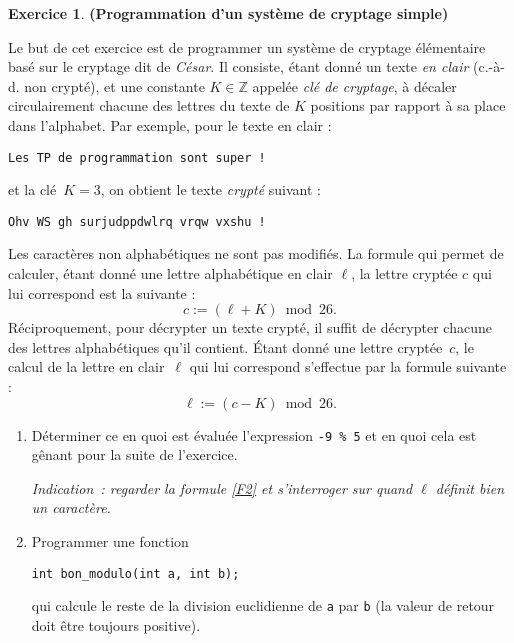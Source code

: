 \documentclass[12pt]{article}
\theoremstyle{definition}
\newtheorem{Exercice}{Exercice}
\begin{document}
\begin{Exercice} {\bf (Programmation d'un système de cryptage simple)}
\smallskip

Le but de cet exercice est de programmer un système de cryptage élémentaire
basé sur le cryptage dit de \textit{César}. Il consiste, étant donné un
texte \textit{en clair} (c.-à-d. non crypté), et une constante
$K \in \mathbb{Z}$ appelée \textit{clé de cryptage}, à décaler
circulairement chacune des lettres du texte de $K$ positions par rapport
à sa place dans l'alphabet. Par exemple, pour le texte en clair :
\begin{center}
    {\tt Les TP de programmation sont super !}
\end{center}
et la clé~$K = 3$, on obtient le texte \textit{crypté} suivant :
\begin{center}
    {\tt Ohv WS gh surjudppdwlrq vrqw vxshu !}
\end{center}
Les caractères non alphabétiques ne sont pas modifiés.
La formule qui permet de calculer, étant donné une lettre alphabétique en clair $\ell$, la
lettre cryptée $c$ qui lui correspond est la suivante :
\begin{equation} \label{F1}
    c := (\ell + K) ~\operatorname{mod}~ 26.
\end{equation}
Réciproquement, pour décrypter un texte crypté, il suffit de décrypter chacune
des lettres alphabétiques qu'il contient. Étant donné une
lettre cryptée~$c$, le calcul de la lettre en clair~$\ell$ qui lui
correspond s'effectue par la formule suivante :
\begin{equation} \label{F2}
    \ell := (c - K) ~\operatorname{mod}~ 26.
\end{equation}
\begin{enumerate}
    \item Déterminer ce en quoi est évaluée l'expression {\tt -9 \% 5}
    et en quoi cela est gênant pour la suite de l'exercice.
    \smallskip

    {\it Indication~: regarder la formule \eqref{F2} et s'interroger sur
    quand $\ell$ définit bien un caractère.}
    \smallskip

    \item Programmer une fonction
\begin{lstlisting}
int bon_modulo(int a, int b);
\end{lstlisting}
    qui calcule le reste de la division euclidienne de {\tt a} par {\tt b}
    (la valeur de retour doit être toujours positive).
    \smallskip


\end{enumerate}
\end{Exercice}
\end{document}
